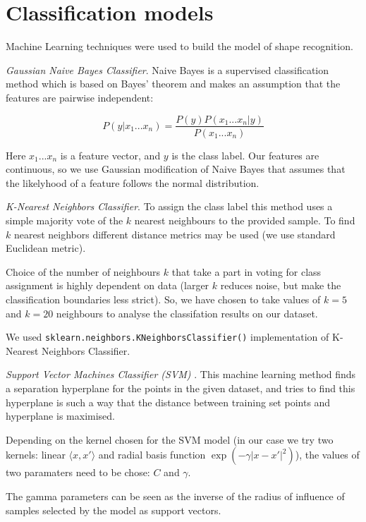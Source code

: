 \documentclass[12pt]{article}
\begin{document}
\section{Classification models}

Machine Learning techniques were used to build the model of shape recognition.  

\textit{Gaussian Naive Bayes Classifier}. Naive Bayes \cite{Bayes} is a supervised classification method which is based on Bayes' theorem and makes an assumption that the features are pairwise independent:

\begin{equation}
	P(y|x_{1} ... x_{n}) = \frac{P(y)P(x_{1} ... x_{n}|y)}{P(x_{1} ... x_{n})}
\end{equation}

Here $x_{1} ... x_{n}$ is a feature vector, and $y$ is the class label. Our features are continuous, so we use Gaussian modification of Naive Bayes that assumes that the likelyhood of a feature follows the normal distribution.

\textit{K-Nearest Neighbors Classifier}\cite{neighb}. To assign the class label this method uses a simple majority vote of the $k$ nearest neighbours to the provided sample. To find $k$ nearest neighbors different distance metrics may be used (we use standard Euclidean metric). 

Choice of the number of neighbours $k$ that take a part in voting for class assignment is highly dependent on data (larger $k$ reduces noise, but make the classification boundaries less strict). So, we have chosen to take values of $k=5$ and $k=20$ neighbours to analyse the classifation results on our dataset.

We used \texttt{sklearn.neighbors.KNeighborsClassifier()} implementation of K-Nearest Neighbors Classifier.
 
\textit{Support Vector Machines Classifier (SVM)} \cite{svm}. This machine learning method finds a separation hyperplane for the points in the given dataset, and tries to find this hyperplane is such a way that the distance between training set points and hyperplane is maximised. 

Depending on the kernel chosen for the SVM model (in our case we try two kernels: linear $\langle x, x'\rangle$ and radial basis function $\exp(-\gamma |x-x'|^2)$), the values of two paramaters need to be chose: $C$ and $\gamma$.



 The gamma parameters can be seen as the inverse of the radius of influence of samples selected by the model as support vectors.
\end{document}
